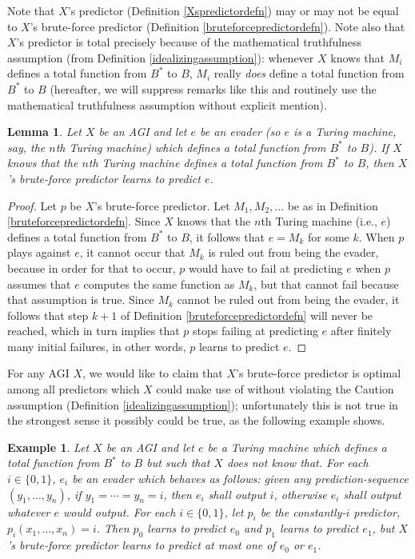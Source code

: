 \documentclass{article}
\newtheorem{example}[theorem]{Example}
\newtheorem{lemma}[theorem]{Lemma}
\begin{document}
Note that $X$'s predictor (Definition \ref{Xspredictordefn})
may or may not be equal to $X$'s brute-force predictor
(Definition \ref{bruteforcepredictordefn}). Note also that $X$'s predictor
is total precisely because of the mathematical truthfulness assumption
(from Definition \ref{idealizingassumption}): whenever $X$ knows that
$M_i$ defines a total function from $B^*$ to $B$, $M_i$ really \emph{does}
define a total function from $B^*$ to $B$ (hereafter, we will suppress
remarks like this and routinely use the mathematical truthfulness assumption
without explicit mention).

\begin{lemma}
    Let $X$ be an AGI and let $e$ be an evader (so $e$ is a Turing machine,
    say, the $n$th Turing machine) which
    defines a total function from $B^*$ to $B$).
    If $X$ knows that the $n$th Turing machine defines a total function from $B^*$ to $B$,
    then $X$'s brute-force predictor learns to predict $e$.
\end{lemma}

\begin{proof}
    Let $p$ be $X$'s brute-force predictor.
    Let $M_1,M_2,\ldots$ be as in Definition \ref{bruteforcepredictordefn}.
    Since $X$ knows that the $n$th Turing machine (i.e., $e$) defines a total
    function from $B^*$ to $B$,
    it follows that $e=M_k$ for some $k$.
    When $p$ plays against $e$, it cannot occur that $M_k$ is ruled out
    from being the evader, because in order for that to occur, $p$ would have
    to fail at predicting $e$ when $p$ assumes that $e$ computes the same
    function as $M_k$, but that cannot fail because that assumption is true.
    Since $M_k$ cannot be ruled out from being the evader, it follows that
    step $k+1$ of Definition \ref{bruteforcepredictordefn} will never be
    reached, which in turn implies that $p$ stops failing at predicting $e$
    after finitely many initial failures, in other words, $p$ learns to
    predict $e$.
\end{proof}

For any AGI $X$, we would like to claim that $X$'s brute-force predictor is
optimal among all predictors which $X$ could make use of without violating the
Caution assumption (Definition \ref{idealizingassumption}); unfortunately this
is not true in the strongest sense it possibly could be true, as the following
example shows.

\begin{example}
    Let $X$ be an AGI and let $e$ be a Turing machine which defines a total
    function from $B^*$ to $B$ but such that $X$ does not know that.
    For each $i\in\{0,1\}$, $e_i$ be an evader which behaves as follows:
    given any prediction-sequence
    $(y_1,\ldots,y_n)$, if $y_1=\cdots=y_n=i$, then $e_i$ shall output $i$,
    otherwise $e_i$ shall output whatever $e$ would output.
    For each $i\in\{0,1\}$, let $p_i$ be the
    constantly-$i$ predictor, $p_i(x_1,\ldots,x_n)=i$.
    Then $p_0$ learns to predict $e_0$ and $p_1$ learns to predict $e_1$,
    but $X$'s brute-force predictor learns to predict at most one of $e_0$ or $e_1$.
\end{example}
\end{document}
